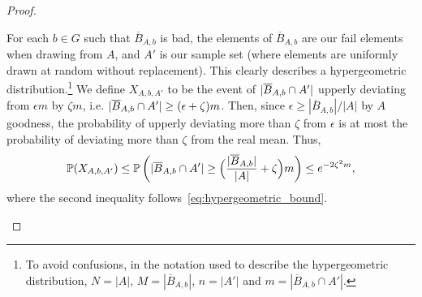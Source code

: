 \begin{lemma}
\begin{proof}
\begin{enumerate}[label=(\alph*), ref=\alph*]
                    For each $b\in G$ such that $\overline{B}_{A,b}$ is bad,
                    the elements of $\overline{B}_{A,b}$ are our fail elements when drawing from $A$, and
                    $A'$ is our sample set (where elements are uniformly drawn at random without replacement).
                    This clearly describes a hypergeometric distribution.\footnote{
                        To avoid confusions, in the notation used to describe the hypergeometric distribution,
                        $N = |A|$, $M = |\overline{B}_{A,b}|$, $n = |A'|$ and $m = |\overline{B}_{A,b} \cap A'|$.}
                    We define $X_{A,b,A'}$ to be the event of $| \overline{B}_{A,b} \cap A' |$ upperly
                    deviating from $\epsilon m$ by $\zeta m$, i.e.
                    $| \overline{B}_{A,b} \cap A' | \geq (\epsilon + \zeta)m$.
                    Then, since $\epsilon \geq |\overline{B}_{A,b}|/|A|$ by $A$ goodness, the probability of upperly
                    deviating more than $\zeta$ from $\epsilon$ is at most the probability of deviating more than $\zeta$ from
                    the real mean.
                    Thus,
                    \[
                        \mathbb{P}( X_{A,b,A'} ) \leq \mathbb{P}\left( | \overline{B}_{A,b} \cap A' | \geq
                            \Bigl( \frac{|\overline{B}_{A,b}|}{|A|} + \zeta \Bigr) m \right) \leq e^{-2\zeta^2 m},
                    \]
                    where the second inequality follows~\eqref{eq:hypergeometric_bound}.


\end{enumerate}
\end{proof}
\end{lemma}
